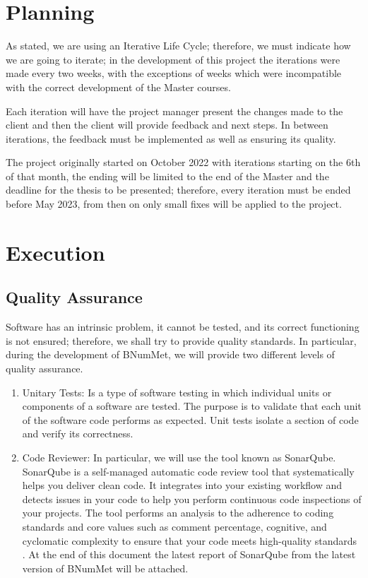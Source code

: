 \section{Planning}
As stated, we are using an Iterative Life Cycle; therefore, we must indicate how we are going to iterate; in the development of this project the iterations were made every two weeks, with the exceptions of weeks which were incompatible with the correct development of the Master courses.

Each iteration will have the project manager present the changes made to the client and then the client will provide feedback and next steps. In between iterations, the feedback must be implemented as well as ensuring its quality.

The project originally started on October 2022 with iterations starting on the 6th of that month, the ending will be limited to the end of the Master and the deadline for the thesis to be presented; therefore, every iteration must be ended before May 2023, from then on only small fixes will be applied to the project.

\section{Execution}
\subsection{Quality Assurance}
Software has an intrinsic problem, it cannot be tested, and its correct functioning is not ensured; therefore, we shall try to provide quality standards. In particular, during the development of BNumMet, we will provide two different levels of quality assurance.
\begin{enumerate}
    \item Unitary Tests: Is a type of software testing in which individual units or components of a software are tested. The purpose is to validate that each unit of the software code performs as expected.  Unit tests isolate a section of code and verify its correctness. 
    
    \item Code Reviewer: In particular, we will use the tool known as SonarQube. SonarQube is a self-managed automatic code review tool that systematically helps you deliver clean code. It integrates into your existing workflow and detects issues in your code to help you perform continuous code inspections of your projects. The tool performs an analysis to the adherence to coding standards and core values such as comment percentage, cognitive, and cyclomatic complexity to ensure that your code meets high-quality standards \cite{sonarsource} \cite{sonarqube}. At the end of this document the latest report of SonarQube from the latest version of BNumMet will be attached.
\end{enumerate}


